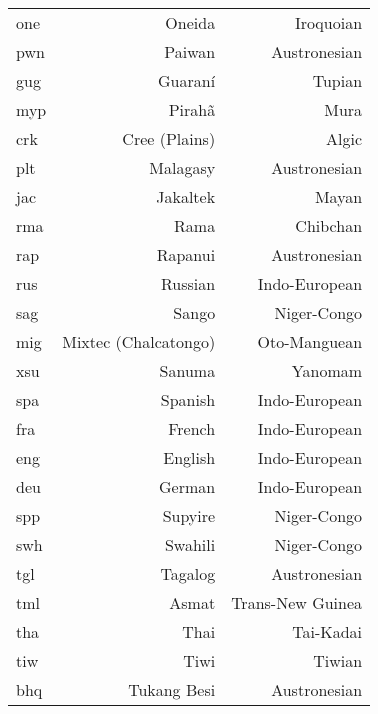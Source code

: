 \begin{longtable}{|l|r|r|}
one                & Oneida                    & Iroquoian            \\
pwn                & Paiwan                    & Austronesian         \\
gug                & Guaraní                   & Tupian               \\
myp                & Pirahã                    & Mura                 \\
crk                & Cree (Plains)             & Algic                \\
plt                & Malagasy                  & Austronesian         \\
jac                & Jakaltek                  & Mayan                \\
rma                & Rama                      & Chibchan             \\
rap                & Rapanui                   & Austronesian         \\
rus                & Russian                   & Indo-European        \\
sag                & Sango                     & Niger-Congo          \\
mig                & Mixtec (Chalcatongo)      & Oto-Manguean         \\
xsu                & Sanuma                    & Yanomam              \\
spa                & Spanish                   & Indo-European        \\
fra                & French                    & Indo-European        \\
eng                & English                   & Indo-European        \\
deu                & German                    & Indo-European        \\
spp                & Supyire                   & Niger-Congo          \\
swh                & Swahili                   & Niger-Congo          \\
tgl                & Tagalog                   & Austronesian         \\
tml                & Asmat                     & Trans-New Guinea     \\
tha                & Thai                      & Tai-Kadai            \\
tiw                & Tiwi                      & Tiwian               \\
bhq                & Tukang Besi               & Austronesian         \\

\end{longtable}
